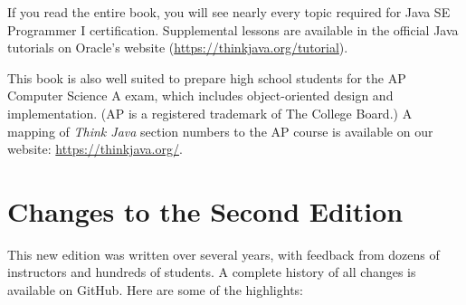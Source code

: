 If you read the entire book, you will see nearly every topic required for Java SE Programmer I certification.
Supplemental lessons are available in the official Java tutorials on Oracle's website (\url{https://thinkjava.org/tutorial}).

This book is also well suited to prepare high school students for the AP Computer Science A exam, which includes object-oriented design and implementation.
(AP is a registered trademark of The College Board.)
A mapping of {\it Think Java} section numbers to the AP course is available on our website: \url{https://thinkjava.org/}.


\section*{Changes to the Second Edition}

This new edition was written over several years, with feedback from dozens of instructors and hundreds of students.
A complete history of all changes is available on GitHub.
Here are some of the highlights:

